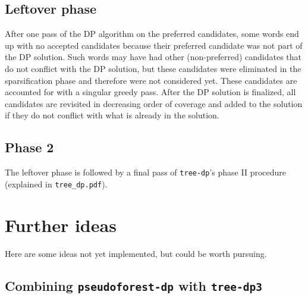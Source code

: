 \documentclass[11pt,a4paper]{article}
\begin{document}
\subsection{Leftover phase}

After one pass of the DP algorithm on the preferred candidates, some words end up with no accepted candidates because their preferred candidate was not part of the DP solution. Such words may have had other (non-preferred) candidates that do not conflict with the DP solution, but these candidates were eliminated in the sparsification phase and therefore were not considered yet. These candidates are accounted for with a singular greedy pass. After the DP solution is finalized, all candidates are revisited in decreasing order of coverage and added to the solution if they do not conflict with what is already in the solution.

\subsection{Phase 2}

The leftover phase is followed by a final pass of \texttt{tree-dp}'s phase II procedure (explained in \texttt{tree\_dp.pdf}).

\newpage

\section{Further ideas}

Here are some ideas not yet implemented, but could be worth pursuing.

\subsection{Combining \texttt{pseudoforest-dp} with \texttt{tree-dp3}}
\end{document}
